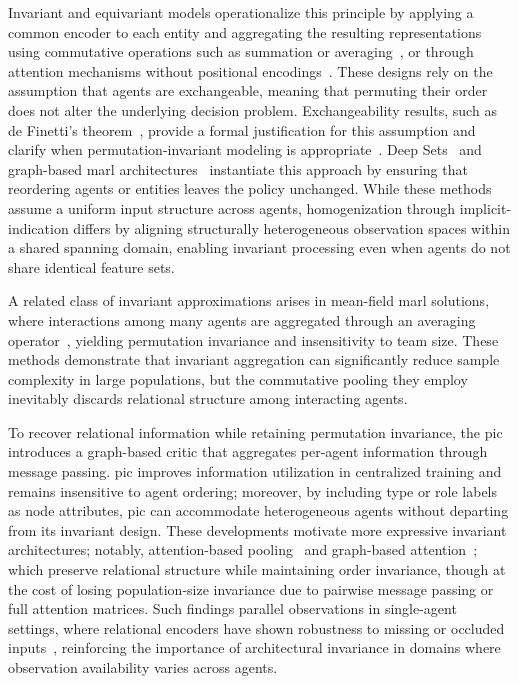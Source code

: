 Invariant and equivariant models operationalize this principle by applying a common encoder
to each entity and aggregating the resulting representations using commutative operations
such as summation or averaging~\cite{yang2018, li2021b}, or through attention mechanisms
without positional encodings~\cite{tang2021, zambaldi2018}.
These designs rely on the assumption that agents are exchangeable, meaning that permuting
their order does not alter the underlying decision problem.
Exchangeability results, such as de Finetti's theorem~\cite{diaconis1980},
provide a formal justification for this assumption and clarify when permutation-invariant
modeling is appropriate~\cite{alvarez-melis2015, zaheer2017}.
Deep Sets~\cite{zaheer2017} and graph-based \gls{marl} architectures~\cite{yang2021a} instantiate 
this approach by ensuring that reordering agents or entities leaves the policy unchanged.
While these methods assume a uniform input structure across agents,
homogenization through implicit-indication differs by aligning structurally 
heterogeneous observation spaces within a shared spanning domain, enabling invariant 
processing even when agents do not share identical feature sets.

A related class of invariant approximations arises in mean-field 
\gls{marl} solutions, where interactions among many agents are 
aggregated through an averaging operator~\cite{yang2018, li2021b}, 
yielding permutation invariance and insensitivity to team size. 
These methods demonstrate that invariant aggregation can 
significantly reduce sample complexity in large populations, 
but the commutative pooling they employ inevitably discards 
relational structure among interacting agents.

To recover relational information while retaining permutation invariance, 
the \gls{pic}~\cite{liu2020b} introduces a graph-based critic that aggregates 
per-agent information through message passing. \Gls{pic} improves information 
utilization in centralized training and remains insensitive to agent ordering; 
moreover, by including type or role labels as node attributes, \gls{pic} can 
accommodate heterogeneous agents without departing from its invariant design. 
These developments motivate more expressive invariant architectures; notably, 
attention-based pooling~\cite{zambaldi2018} and graph-based attention~\cite{hao2023};
which preserve relational structure while maintaining order invariance, 
though at the cost of losing population-size invariance due to pairwise 
message passing or full attention matrices. Such findings parallel observations 
in single-agent settings, where relational encoders have shown robustness 
to missing or occluded inputs~\cite{tang2021}, reinforcing the 
importance of architectural invariance in domains where observation 
availability varies across agents.

